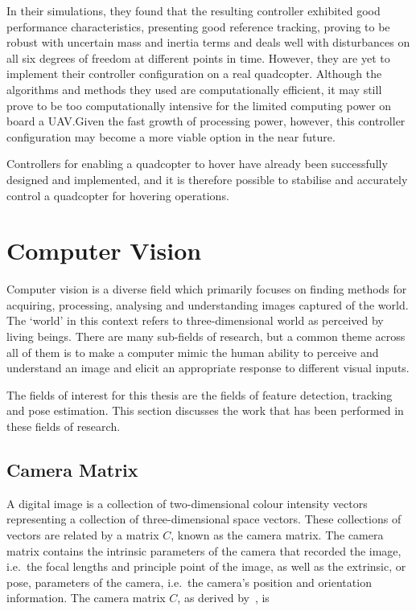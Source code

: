 In their simulations, they found that the resulting controller exhibited good performance characteristics, presenting good reference tracking, proving to be robust with uncertain mass and inertia terms and deals well with disturbances on all six degrees of freedom at different points in time. However, they are yet to implement their controller configuration on a real quadcopter. Although the algorithms and methods they used are computationally efficient, it may still prove to be too computationally intensive for the limited computing power on board a UAV.\@ Given the fast growth of processing power, however, this controller configuration may become a more viable option in the near future. 

Controllers for enabling a quadcopter to hover have already been successfully designed and implemented, and it is therefore possible to stabilise and accurately control a quadcopter for hovering operations. 

\section{Computer Vision}

Computer vision is a diverse field which primarily focuses on finding methods for acquiring, processing, analysing and understanding images captured of the world. The `world' in this context refers to three-dimensional world as perceived by living beings. There are many sub-fields of research, but a common theme across all of them is to make a computer mimic the human ability to perceive and understand an image and elicit an appropriate response to different visual inputs. 

The fields of interest for this thesis are the fields of feature detection, tracking and pose estimation. This section discusses the work that has been performed in these fields of research.  

\subsection{Camera Matrix}

A digital image is a collection of two-dimensional colour intensity vectors representing a collection of three-dimensional space vectors. These collections of vectors are related by a matrix $C$, known as the camera matrix. The camera matrix contains the intrinsic parameters of the camera that recorded the image, i.e.\ the focal lengths and principle point of the image, as well as the extrinsic, or pose, parameters of the camera, i.e.\ the camera's position and orientation information. The camera matrix $C$, as derived by~\cite{heikkila1997four}, is 

